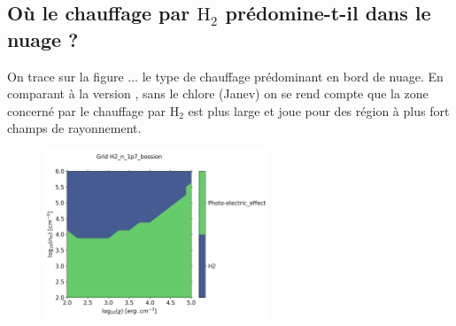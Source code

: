 \subsection{Où le chauffage par $\mathrm{H}_2$ prédomine-t-il dans le nuage ?}

On trace sur la figure ... le type de chauffage prédominant en bord de nuage. En comparant à la version \uncinq, sans le chlore (Janev) on se rend compte que la zone concerné par le chauffage par $\mathrm{H}_2$ est plus large et joue pour des région à plus fort champs de rayonnement. \newline

\begin{figure}[h!]
    \centering
    \includegraphics[width = 0.6\textwidth]{figure/H2/mapGloverBossion/mapGmax.png}
    \caption{}
    \label{fig:H2:mapGloverBossion:Gmax}
\end{figure}

